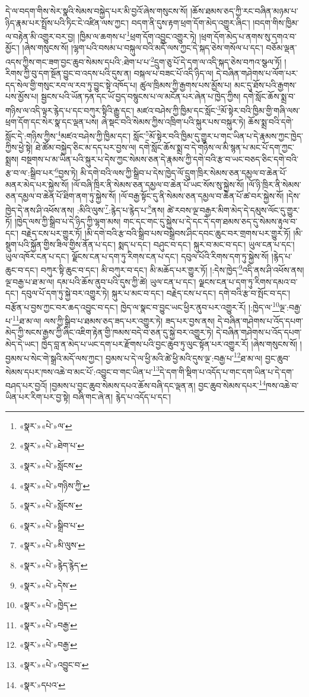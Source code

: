 དེ་ལ་བདག་གིས་སེར་སྣའི་སེམས་བསྐྱེད་པར་མི་བྱའོ་ཞེས་གསུངས་སོ། །ཆོས་ཐམས་ཅད་ཀྱི་རང་བཞིན་མཉམ་པ་ཉིད་རྣམ་པར་སྤྲོས་པའི་ཏིང་ངེ་འཛིན་ལས་ཀྱང་། བདག་ནི་དུས་རྟག་ཕྲག་དོག་མེད་འགྱུར་ཞིང་། །བདག་གིས་ཁྱིམ་ལ་བརྟེན་མི་འགྱུར་བར་བྱ། །ཁྱིམ་ལ་ཆགས་པ་\footnote{«སྣར་»«པེ་»ལ་}ཕྲག་དོག་འབྱུང་འགྱུར་ཏེ། །ཕྲག་དོག་མེད་པ་ནགས་སུ་དགའ་བ་མྱོང་། །ཞེས་གསུངས་སོ། །ལྷག་པའི་བསམ་པ་བསྐུལ་བའི་མདོ་ལས་ཀྱང་དེ་སྐད་ཅེས་གསོལ་པ་དང་། བཅོམ་ལྡན་འདས་ཀྱིས་གང་ཟག་བྱང་ཆུབ་སེམས་དཔའི་:ཐེག་པ་པ་\footnote{«སྣར་»«པེ་»ཐེག་པ་}དྲུག་ཅུ་པོ་དེ་དག་ལ་འདི་སྐད་ཅེས་བཀའ་སྩལ་ཏོ། །རིགས་ཀྱི་བུ་དག་སྔོན་བྱུང་བ་འདས་པའི་དུས་ན། བསྐལ་པ་བཟང་པོ་འདི་ཉིད་ལ། དེ་བཞིན་གཤེགས་པ་ལོག་པར་དད་སེལ་གྱི་གསུང་རབ་ལ་རབ་ཏུ་བྱུང་སྟེ་འཁོད་པ། ཚུལ་ཁྲིམས་ཀྱི་རྒྱགས་པས་མྱོས་པ། མང་དུ་ཐོས་པའི་རྒྱགས་པས་མྱོས་པ། སྦྱངས་པའི་ཡོན་ཏན་དང་ཡོ་བྱད་བསྙུངས་པ་ལ་མངོན་པར་ཞེན་པ་ཁྱེད་ཀྱིས། དགེ་སློང་ཆོས་སྨྲ་བ་གཉིས་ལ་འདི་ལྟར་རྙེད་པ་དང་བཀུར་སྟིའི་རྒྱུ་དང་། མཛའ་བཤེས་ཀྱི་ཁྱིམ་དང་སློང་\footnote{«སྣར་»«པེ་»སློངས་}མོ་སྟེར་བའི་ཁྱིམ་གྱི་གཞི་ལས་ཕྲག་དོག་དང་སེར་སྣ་དང་ལྡན་པས། ཞེ་སྡང་བའི་སེམས་ཀྱིས་འཁྲིག་པའི་སྐུར་པས་བསྐུར་ཏེ། ཆོས་སྨྲ་བའི་དགེ་སློང་དེ་:གཉིས་ཀྱིས་\footnote{«སྣར་»«པེ་»གཉིས་ཀྱི་}མཛའ་བཤེས་ཀྱི་ཁྱིམ་དང་། སློང་\footnote{«སྣར་»«པེ་»སློངས་}མོ་སྟེར་བའི་ཁྱིམ་དུ་གྱུར་པ་གང་ཡིན་པ་དེ་རྣམས་ཀྱང་ཁྱེད་ཀྱིས་ཕྱེ་སྟེ། ཐེ་ཚོམ་བསྐྱེད་ཅིང་མ་དད་པར་བྱས་ལ། དགེ་སློང་ཆོས་སྨྲ་བ་དེ་གཉིས་ལ་མི་སྙན་པ་མང་པོ་དག་ཀྱང་སྨྲས། བསྔགས་པ་མ་ཡིན་པའི་སྐུར་པ་དེས་ཀྱང་སེམས་ཅན་དེ་རྣམས་ཀྱི་དགེ་བའི་རྩ་བ་ཡང་བཅད་ཅིང་དགེ་བའི་རྩ་བ་ལ་:སྒྲིབ་པར་\footnote{«སྣར་»«པེ་»སྒྲིབ་པ་}བྱས་ཏེ། མི་དགེ་བའི་ལས་ཀྱི་སྒྲིབ་པ་དེས་ཁྱེད་ལོ་དྲུག་ཁྲིར་སེམས་ཅན་དམྱལ་བ་ཆེན་པོ་མནར་མེད་པར་སྐྱེས་སོ། །ལོ་བཞི་ཁྲིར་ནི་སེམས་ཅན་དམྱལ་བ་ཆེན་པོ་ཡང་སོས་སུ་སྐྱེས་སོ། །ལོ་ཉི་ཁྲིར་ནི་སེམས་ཅན་དམྱལ་བ་ཆེན་པོ་ཐིག་ནག་ཏུ་སྐྱེས་སོ། །ལོ་བརྒྱ་སྟོང་དུ་ནི་སེམས་ཅན་དམྱལ་བ་ཆེན་པོ་ཚ་བར་སྐྱེས་སོ། །དེས་ཁྱེད་དེ་ནས་ཤི་འཕོས་ནས། :མིའི་ལུས་\footnote{«སྣར་»«པེ་»མི་ལུས་}:རྙེད་པ་རྙེད་པ་\footnote{«སྣར་»«པེ་»རྙེད་རྙེད་}ནས། ཚེ་རབས་ལྔ་བརྒྱར་མིག་མེད་དེ་དམུས་ལོང་དུ་གྱུར་ཏོ། །ཁྱེད་ལས་ཀྱི་སྒྲིབ་པ་དེ་ཉིད་ཀྱི་ལྷག་མས། གང་དང་གང་དུ་སྐྱེས་པ་དེ་དང་དེ་དག་ཐམས་ཅད་དུ་སེམས་རྟུལ་བ་དང་། བརྗེད་ངས་པར་གྱུར་ཏོ། །མི་དགེ་བའི་རྩ་བའི་སྒྲིབ་པས་བསྒྲིབས་ཤིང་དབང་ཆུང་བར་གྲགས་པར་གྱུར་ཏོ། །མི་སྡུག་པའི་སྐྱོན་གྱིས་ཟིལ་གྱིས་ནོན་པ་དང་། སྨད་པ་དང་། བཤུང་བ་དང་། སྐུར་བ་མང་བ་དང་། ཡུལ་ངན་པ་དང་། ཡུལ་འཁོར་ངན་པ་དང་། ལྗོངས་ངན་པ་དག་ཏུ་རིགས་ངན་པ་དང་། དབུལ་པོའི་རིགས་དག་ཏུ་སྐྱེས་སོ། །རྙེད་པ་ཆུང་བ་དང་། བཀུར་སྟི་ཆུང་བ་དང་། མི་བཀུར་བ་དང་། མི་མཆོད་པར་གྱུར་ཏོ། །:དེས་ཁྱེད་\footnote{«སྣར་»«པེ་»དེས་}འདི་ནས་ཤི་འཕོས་ནས། ལྔ་བརྒྱ་པ་ཐ་མ་ལ། དམ་པའི་ཆོས་ནུབ་པའི་དུས་ཀྱི་ཚེ། ཡུལ་ངན་པ་དང་། ལྗངས་ངན་པ་དག་ཏུ་རིགས་དམའ་བ་དང་། དབུལ་པོ་དག་ཏུ་སྐྱེ་བར་འགྱུར་ཏེ། སྐུར་པ་མང་བ་དང་། བརྗེད་ངས་པ་དང་། དགེ་བའི་རྩ་བ་སྤོང་བ་དང་། བརྩོན་པ་བྱས་ཀྱང་བར་ཆད་འབྱུང་བ་དང་། ཁྱེད་ལ་སྣང་བ་བྱུང་ཡང་ཕྱིར་ནུབ་པར་འགྱུར་རོ། །:ཁྱེད་ལ་\footnote{«སྣར་»«པེ་»ཁྱེད་}ལྔ་:བརྒྱ་པ་\footnote{«སྣར་»«པེ་»བརྒྱ་}ཐ་མ་ལ། ལས་ཀྱི་སྒྲིབ་པ་ཐམས་ཅད་ཟད་པར་འགྱུར་ཏེ། ཟད་པར་བྱས་ནས། དེ་བཞིན་གཤེགས་པ་འོད་དཔག་མེད་ཀྱི་སངས་རྒྱས་ཀྱི་ཞིང་འཇིག་རྟེན་གྱི་ཁམས་བདེ་བ་ཅན་དུ་སྐྱེ་བར་འགྱུར་ཏེ། དེ་བཞིན་གཤེགས་པ་འོད་དཔག་མེད་དེ་ཡང་། ཁྱེད་བླ་ན་མེད་པ་ཡང་དག་པར་རྫོགས་པའི་བྱང་ཆུབ་ཏུ་ལུང་སྟོན་པར་འགྱུར་རོ། །ཞེས་གསུངས་སོ། །བྱམས་པ་སེང་གེ་སྒྲའི་མདོ་ལས་ཀྱང་། བྱམས་པ་དེ་ལ་ཕྱི་མའི་ཚེ་ཕྱི་མའི་དུས་ལྔ་:བརྒྱ་པ་\footnote{«སྣར་»«པེ་»བརྒྱ་}ཐ་མ་ལ། བྱང་ཆུབ་སེམས་དཔར་ཁས་འཆེ་བ་མང་པོ་:འབྱུང་བ་གང་ཡིན་པ་\footnote{«སྣར་»«པེ་»འབྱུང་བ་}དེ་དག་གི་སྡིག་པ་འདོད་པ་གང་དག་ཡིན་པ་དེ་དག་བཤད་པར་བྱའོ། །བྱམས་པ་བྱང་ཆུབ་སེམས་དཔའ་ཆོས་བཞི་དང་ལྡན་ན། བྱང་ཆུབ་སེམས་དཔར་\footnote{«སྣར་»དཔའ་}ཁས་འཆེ་བ་ཡིན་པར་རིག་པར་བྱ་སྟེ། བཞི་གང་ཞེ་ན། རྙེད་པ་འདོད་པ་དང་། 